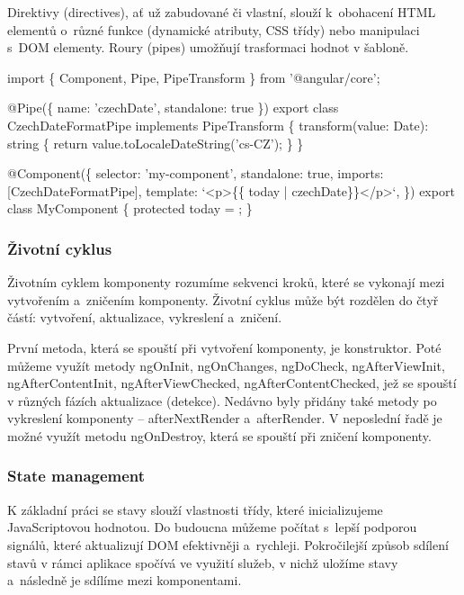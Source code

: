 Direktivy (directives), ať už zabudované či vlastní, slouží k~obohacení HTML elementů o~různé funkce (dynamické atributy, CSS třídy) nebo manipulaci s~DOM elementy. 
Roury (pipes) umožňují trasformaci hodnot v šabloně.\cite{angulardev,angulario}

\begin{prog}
import \{ Component, Pipe, PipeTransform \} from '@angular/core';

@Pipe(\{ name: 'czechDate', standalone: true \})
export class CzechDateFormatPipe implements PipeTransform \{
  transform(value: Date): string \{
    return value.toLocaleDateString('cs-CZ');
  \}
\}

@Component(\{
  selector: 'my-component',
  standalone: true,
  imports: [CzechDateFormatPipe],
  template: `<p>\{\{ today | czechDate\}\}</p>`,
\})
export class MyComponent \{
  protected today = ;
\}
\end{prog}

\subsubsection{Životní cyklus}

Životním cyklem komponenty rozumíme sekvenci kroků, které se vykonají mezi vytvořením a~zničením komponenty. 
Životní cyklus může být rozdělen do čtyř částí: vytvoření, aktualizace, vykreslení a~zničení. 

První metoda, která se spouští při vytvoření komponenty, je konstruktor. 
Poté můžeme využít metody ngOnInit, ngOnChanges, ngDoCheck, ngAfterViewInit, ngAfterContentInit, ngAfterViewChecked, ngAfterContentChecked, jež se spouští v různých fázích aktualizace (detekce). 
Nedávno byly přidány také metody po vykreslení komponenty -- afterNextRender a~afterRender. V neposlední řadě je možné využít metodu ngOnDestroy, která se spouští při zničení komponenty.\cite{angulardev,learningangular} 

\subsubsection{State management}

K základní práci se stavy slouží vlastnosti třídy, které inicializujeme JavaScriptovou hodnotou. 
Do budoucna můžeme počítat s~lepší podporou signálů, které aktualizují DOM efektivněji a~rychleji. 
Pokročilejší způsob sdílení stavů v rámci aplikace spočívá ve využití služeb, v nichž uložíme stavy a~následně je sdílíme mezi komponentami.\cite{angulardev}

